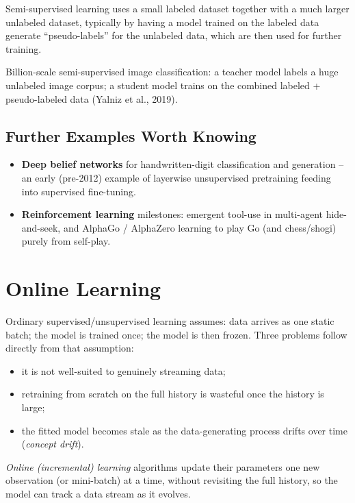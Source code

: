 \documentclass[11pt]{article}
\begin{document}
\begin{definition}
Semi-supervised learning uses a small labeled dataset together with a much
larger unlabeled dataset, typically by having a model trained on the
labeled data generate ``pseudo-labels'' for the unlabeled data, which are
then used for further training.
\end{definition}

\begin{example}
Billion-scale semi-supervised image classification: a teacher model labels
a huge unlabeled image corpus; a student model trains on the combined
labeled + pseudo-labeled data (Yalniz et al., 2019).
\end{example}

\subsection{Further Examples Worth Knowing}
\begin{itemize}[nosep]
  \item \textbf{Deep belief networks} for handwritten-digit classification
        and generation -- an early (pre-2012) example of layerwise
        unsupervised pretraining feeding into supervised fine-tuning.
  \item \textbf{Reinforcement learning} milestones: emergent tool-use in
        multi-agent hide-and-seek, and AlphaGo / AlphaZero learning to play
        Go (and chess/shogi) purely from self-play.
\end{itemize}

\section{Online Learning}

Ordinary supervised/unsupervised learning assumes: data arrives as one
static batch; the model is trained once; the model is then frozen. Three
problems follow directly from that assumption:
\begin{itemize}[nosep]
  \item it is not well-suited to genuinely streaming data;
  \item retraining from scratch on the full history is wasteful once the
        history is large;
  \item the fitted model becomes stale as the data-generating process
        drifts over time (\emph{concept drift}).
\end{itemize}

\begin{definition}
\emph{Online (incremental) learning} algorithms update their parameters one
new observation (or mini-batch) at a time, without revisiting the full
history, so the model can track a data stream as it evolves.
\end{definition}
\end{document}

